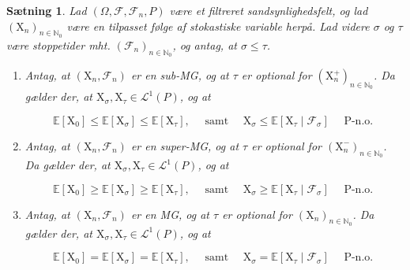 \documentclass{article}
\newcommand{\1}{\mathbbm{1}}
\theoremstyle{boxed}
\newtheorem{proposition}[theorem]{Sætning}
\begin{document}
\begin{theorem-box}
    \begin{proposition}
        Lad $\left(\Omega, \mathcal{F}, \mathcal{F}_n, P\right)$ være et filtreret sandsynlighedsfelt, og lad $\left(\mathrm{X}_n\right)_{n \in \mathbb{N}_0}$ være en tilpasset følge af stokastiske variable herpå.
Lad videre $\sigma$ og $\tau$ være stoppetider mht. $\left(\mathcal{F}_n\right)_{n \in \mathbb{N}_0}$, og antag, at $\sigma \leq \tau$.
\begin{enumerate}
    \item[\textnormal{(i)}] Antag, at $\left(\mathrm{X}_n, \mathcal{F}_n\right)$ er en sub-MG, og at $\tau$ er optional for $\left(\mathrm{X}_n^{+}\right)_{n \in \mathbb{N}_0}$. Da gælder der, at $\mathrm{X}_\sigma, \mathrm{X}_\tau \in \mathcal{L}^1(P)$, og at

$$
\mathbb{E}\left[\mathrm{X}_0\right] \leq \mathbb{E}\left[\mathrm{X}_\sigma\right] \leq \mathbb{E}\left[\mathrm{X}_\tau\right], \quad \text { samt } \quad \mathrm{X}_\sigma \leq \mathbb{E}\left[\mathrm{X}_\tau \mid \mathcal{F}_\sigma\right] \quad \text { P-n.o. }
$$
    \item[\textnormal{(ii)}] Antag, at $\left(\mathrm{X}_n, \mathcal{F}_n\right)$ er en super-MG, og at $\tau$ er optional for $\left(\mathrm{X}_n^{-}\right)_{n \in \mathbb{N}_0}$. Da gælder der, at $\mathrm{X}_\sigma, \mathrm{X}_\tau \in \mathcal{L}^1(P)$, og at

$$
\mathbb{E}\left[\mathrm{X}_0\right] \geq \mathbb{E}\left[\mathrm{X}_\sigma\right] \geq \mathbb{E}\left[\mathrm{X}_\tau\right], \quad \text { samt } \quad \mathrm{X}_\sigma \geq \mathbb{E}\left[\mathrm{X}_\tau \mid \mathcal{F}_\sigma\right] \quad \text { P-n.o. }
$$
    \item[\textnormal{(iii)}] Antag, at $\left(\mathrm{X}_n, \mathcal{F}_n\right)$ er en MG, og at $\tau$ er optional for $\left(\mathrm{X}_n\right)_{n \in \mathbb{N}_0}$. Da gælder der, at $\mathrm{X}_\sigma, \mathrm{X}_\tau \in \mathcal{L}^1(P)$, og at

$$
\mathbb{E}\left[\mathrm{X}_0\right]=\mathbb{E}\left[\mathrm{X}_\sigma\right]=\mathbb{E}\left[\mathrm{X}_\tau\right], \quad \text { samt } \quad \mathrm{X}_\sigma=\mathbb{E}\left[\mathrm{X}_\tau \mid \mathcal{F}_\sigma\right] \quad \text { P-n.o. }
$$
\end{enumerate}
    \end{proposition}
\end{theorem-box}
\end{document}

